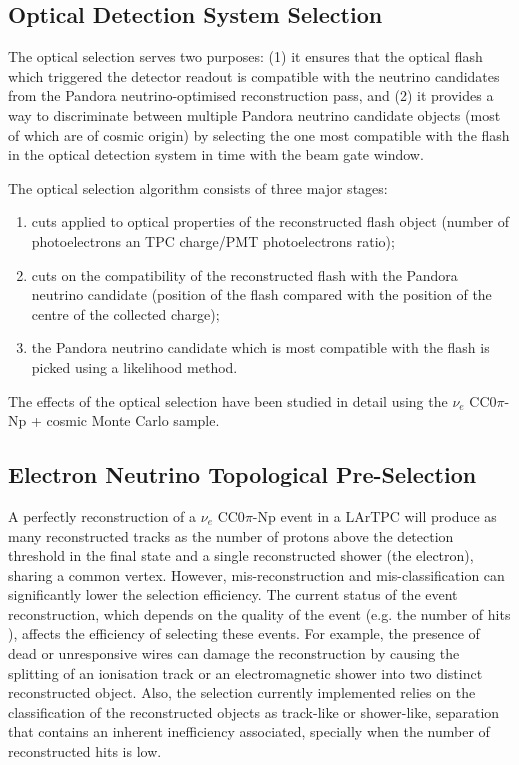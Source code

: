 \subsection{Optical Detection System Selection}\label{sec:optical_pre_cuts}
The optical selection serves two purposes: (1) it ensures that the optical flash which triggered the detector readout is compatible with the neutrino candidates from the Pandora neutrino-optimised reconstruction pass, and (2) it provides a way to discriminate between multiple Pandora neutrino candidate objects (most of which are of cosmic origin) by selecting the one most compatible with the flash in the optical detection system in time with the beam gate window.

The optical selection algorithm consists of three major stages:
\begin{enumerate}
\item cuts applied to optical properties of the reconstructed flash object (number of photoelectrons an TPC charge/PMT photoelectrons ratio);
\item cuts on the compatibility of the reconstructed flash with the Pandora neutrino candidate (position of the flash compared with the position of the centre of the collected charge);
\item the Pandora neutrino candidate which is most compatible with the flash is picked using a likelihood method.
\end{enumerate}

The effects of the optical selection have been studied in detail using the $\nu_{e}$ CC0$\pi$-Np + cosmic Monte Carlo sample.



\subsection{Electron Neutrino Topological Pre-Selection} \label{sec:topological_pre_selection}
A perfectly reconstruction of a $\nu_{e}$ CC0$\pi$-Np event in a LArTPC will produce as many reconstructed tracks as the number of protons above the detection threshold in the final state and a single reconstructed shower (the electron), sharing a common vertex. However, mis-reconstruction and mis-classification can significantly lower the selection efficiency. The current status of the event reconstruction, which depends on the quality of the event (e.g. the number of hits \cite{pandora}), affects the efficiency of selecting these events. For example, the presence of dead or unresponsive wires can damage the reconstruction by causing the splitting of an ionisation track or an electromagnetic shower into two distinct reconstructed object. Also, the selection currently implemented relies on the classification of the reconstructed objects as track-like or shower-like, separation that contains an inherent inefficiency associated, specially when the number of reconstructed hits is low.

